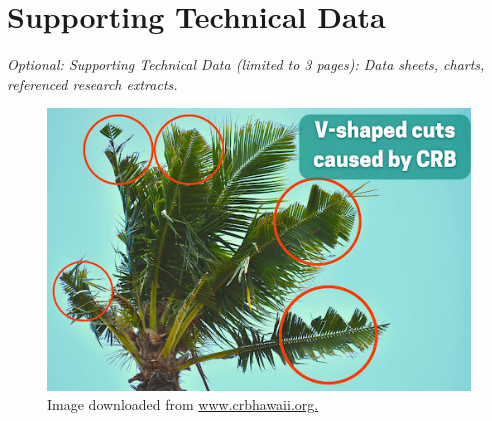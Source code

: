 \documentclass[11pt,english,letterpaper]{scrartcl}
\begin{document}
%
%
%
%
%
%	
%
%	
%
%	
%
%	
%

\clearpage
\section{Supporting Technical Data}

\textit{Optional: Supporting Technical Data (limited to 3 pages): Data sheets, charts, referenced research extracts.} \\

\begin{figure}[H]
	\centering
	\includegraphics[width=0.7\linewidth]{images/vcuts}
	\caption{Image downloaded from \url{www.crbhawaii.org.}}
	\label{fig:vcuts}
\end{figure}
\end{document}
